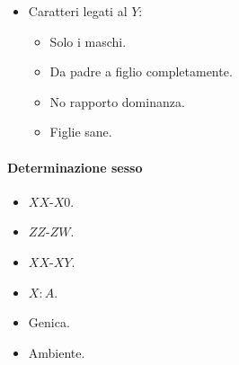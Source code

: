 \begin{multicols}{2}
\begin{itemize}
\begin{itemize}
			\item Maschi affetti a figlie non figli.
			\item Donne affetti met\`a figli e met\`a figlie.
			\item Maschi solo dalla madre.
		\end{itemize}
	\item Caratteri legati al $Y$:
		\begin{itemize}
			\item Solo i maschi.
			\item Da padre a figlio completamente.
			\item No rapporto dominanza.
			\item Figlie sane.
		\end{itemize}
\end{itemize}

\paragraph*{Determinazione sesso}
\begin{multicols}{2}
\begin{itemize}
	\item $XX$-$X0$.
	\item $ZZ$-$ZW$.
	\item $XX$-$XY$.
	\item $X:A$.
	\item Genica.
	\item Ambiente.
\end{itemize}
\end{multicols}


\end{multicols}
